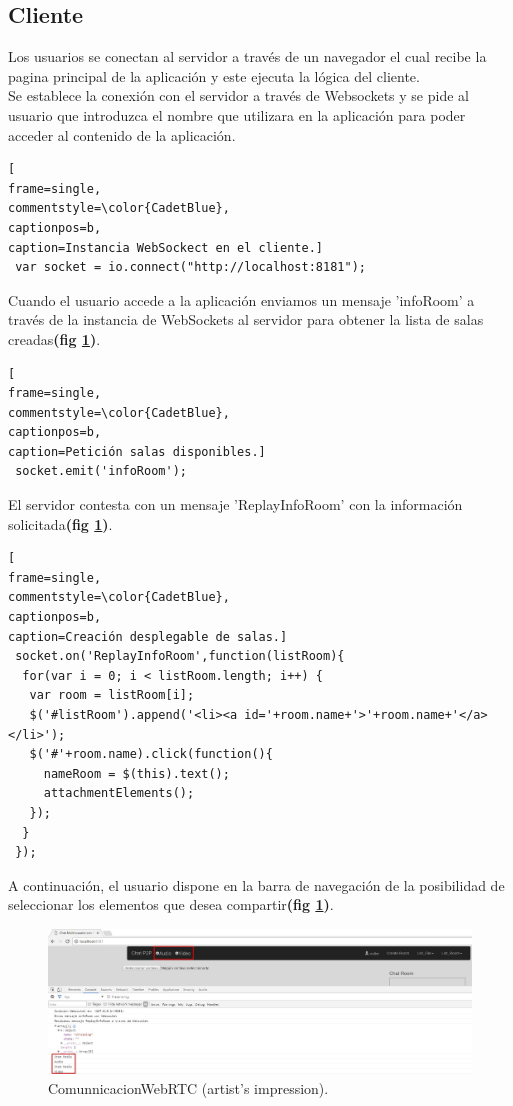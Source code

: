 \subsection{Cliente}
Los usuarios se conectan al servidor a través de un navegador el cual recibe la pagina principal de la aplicación y este ejecuta la lógica del cliente.
\\Se establece la conexión con el servidor a través de Websockets y se pide al usuario que introduzca el nombre que utilizara en la aplicación para poder acceder al contenido de la aplicación.
\begin{lstlisting}[
frame=single,
commentstyle=\color{CadetBlue},
captionpos=b,
caption=Instancia WebSockect en el cliente.]
 var socket = io.connect("http://localhost:8181");
\end{lstlisting}
Cuando el usuario accede a la aplicación enviamos un mensaje 'infoRoom' a través de la instancia de WebSockets al servidor para obtener la lista de salas creadas\textbf{(fig \ref{fig:SelectItemsClient})}.
\begin{lstlisting}[
frame=single,
commentstyle=\color{CadetBlue},
captionpos=b,
caption=Petición salas disponibles.]
 socket.emit('infoRoom');
\end{lstlisting}
El servidor contesta con un mensaje 'ReplayInfoRoom' con la información solicitada\textbf{(fig \ref{fig:SelectItemsClient})}.
\begin{lstlisting}[
frame=single,
commentstyle=\color{CadetBlue},
captionpos=b,
caption=Creación desplegable de salas.]
 socket.on('ReplayInfoRoom',function(listRoom){
  for(var i = 0; i < listRoom.length; i++) {
   var room = listRoom[i];
   $('#listRoom').append('<li><a id='+room.name+'>'+room.name+'</a></li>');
   $('#'+room.name).click(function(){
     nameRoom = $(this).text();
     attachmentElements();
   });
  }
 });
\end{lstlisting}
A continuación, el usuario dispone en la barra de navegación de la posibilidad de seleccionar los elementos que desea compartir\textbf{(fig \ref{fig:SelectItemsClient})}.
\begin{figure}[!h]
\centering
\includegraphics[width=0.7\linewidth]{Figures/SelectItemsClient}
\decoRule
\caption[An Electron]{ComunnicacionWebRTC (artist's impression).}
\label{fig:SelectItemsClient}
\end{figure}
